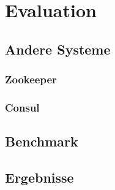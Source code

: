 \chapter{Evaluation}
\label{eval}

\section{Andere Systeme}

\subsection{Zookeeper}

\subsection{Consul}

\section{Benchmark}

\section{Ergebnisse}


